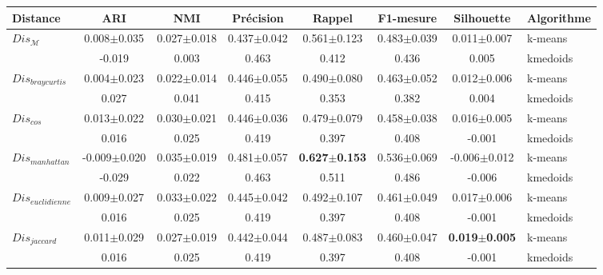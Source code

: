 \begin{table}[!htb] %
	\scriptsize\centering
	\begin{tabular}{|l||c|c||c|c|c||c||l|}
		\hline
		Distance & ARI & NMI & Précision & Rappel & F1-mesure & Silhouette & Algorithme\\ \hline
		
		
		\multirow{2}{*}{$Dis_\mathcal{M}$} & 0.008$\pm$0.035 & 0.027$\pm$0.018 & 0.437$\pm$0.042 & 0.561$\pm$0.123 & 0.483$\pm$0.039 & 0.011$\pm$0.007 & k-means \\
		 & -0.019 & 0.003 & 0.463 & 0.412 & 0.436 & 0.005 & kmedoids \\ \hline
		
		
		\multirow{2}{*}{$Dis_{braycurtis}$} & 0.004$\pm$0.023 & 0.022$\pm$0.014 & 0.446$\pm$0.055 & 0.490$\pm$0.080 & 0.463$\pm$0.052 & 0.012$\pm$0.006 & k-means \\
		 & 0.027 & 0.041 & 0.415 & 0.353 & 0.382 & 0.004 & kmedoids \\ \hline
		
		\multirow{2}{*}{$Dis_{cos}$} & 0.013$\pm$0.022 & 0.030$\pm$0.021 & 0.446$\pm$0.036 & 0.479$\pm$0.079 & 0.458$\pm$0.038 & 0.016$\pm$0.005 & k-means \\
		 & 0.016 & 0.025 & 0.419 & 0.397 & 0.408 & -0.001 & kmedoids \\ \hline
		
		
		\multirow{2}{*}{$Dis_{manhattan}$} & -0.009$\pm$0.020 & 0.035$\pm$0.019 & 0.481$\pm$0.057 & \textbf{0.627$\pm$0.153} & 0.536$\pm$0.069 & -0.006$\pm$0.012 & k-means \\
		 & -0.029 & 0.022 & 0.463 & 0.511 & 0.486 & -0.006 & kmedoids \\ \hline
		
		\multirow{2}{*}{$Dis_{euclidienne}$} & 0.009$\pm$0.027 & 0.033$\pm$0.022 & 0.445$\pm$0.042 & 0.492$\pm$0.107 & 0.461$\pm$0.049 & 0.017$\pm$0.006 & k-means \\
		 & 0.016 & 0.025 & 0.419 & 0.397 & 0.408 & -0.001 & kmedoids \\ \hline
		
		\multirow{2}{*}{$Dis_{jaccard}$} & 0.011$\pm$0.029 & 0.027$\pm$0.019 & 0.442$\pm$0.044 & 0.487$\pm$0.083 & 0.460$\pm$0.047 & \textbf{0.019$\pm$0.005} & k-means \\
		 & 0.016 & 0.025 & 0.419 & 0.397 & 0.408 & -0.001 & kmedoids \\ \hline
		

\end{tabular}
\end{table}
